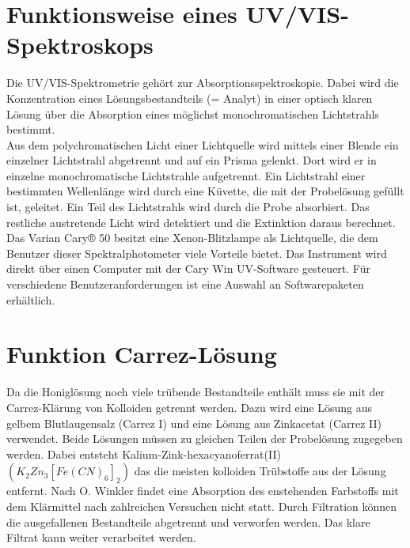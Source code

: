 \section{Funktionsweise eines UV/VIS-Spektroskops}
Die UV/VIS-Spektrometrie gehört zur Absorptionsspektroskopie. Dabei wird die Konzentration
eines Lösungsbestandteils (= Analyt) in einer optisch klaren Lösung über die Absorption
eines möglichst monochromatischen Lichtstrahls bestimmt.\\
Aus dem polychromatischen Licht einer Lichtquelle wird mittels einer Blende ein einzelner
Lichtstrahl abgetrennt und auf ein Prisma gelenkt. Dort wird er in einzelne monochromatische
Lichtstrahle aufgetrennt. Ein Lichtstrahl einer bestimmten Wellenlänge wird
durch eine Küvette, die mit der Probelösung gefüllt ist, geleitet. Ein Teil des Lichtstrahls wird
durch die Probe absorbiert. Das restliche austretende Licht wird detektiert und die Extinktion
daraus berechnet.
Das Varian Cary® 50 besitzt eine Xenon-Blitzlampe als Lichtquelle, die dem Benutzer dieser
Spektralphotometer viele Vorteile bietet. Das Instrument wird direkt über einen Computer mit
der Cary Win UV-Software gesteuert. Für verschiedene Benutzeranforderungen ist eine Auswahl
an Softwarepaketen erhältlich.


\section{Funktion Carrez-Lösung}
Da die Honiglösung noch viele trübende Bestandteile enthält muss sie mit der Carrez-Klärung von Kolloiden getrennt werden. Dazu wird eine Lösung aus gelbem Blutlaugensalz (Carrez I) und eine Lösung aus Zinkacetat (Carrez II) verwendet. Beide Lösungen müssen zu gleichen Teilen der Probelösung zugegeben werden. Dabei entsteht Kalium-Zink-hexacyanoferrat(II) $(K_{2}Zn_{3}[Fe(CN)_{6}]_{2})$ das die meisten kolloiden Trübstoffe aus der Lösung entfernt. Nach O. Winkler findet eine Absorption des enstehenden Farbstoffs mit dem Klärmittel nach zahlreichen Versuchen nicht statt. Durch Filtration können die ausgefallenen Bestandteile abgetrennt und verworfen werden. Das klare Filtrat kann weiter verarbeitet werden. \cite{Winkler} %


